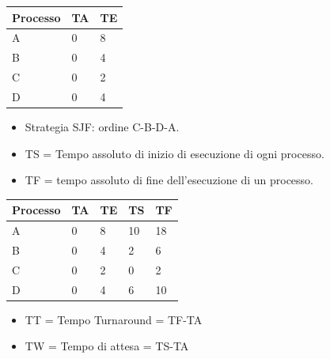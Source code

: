 \documentclass{article}
\begin{document}
\vskip 0.3cm
\begin{tabular}{|p{}|p{}|p{}|}
\hline
Processo        & TA              & TE      \\
\hline
A            & 0             & 8      \\
B            & 0             & 4      \\
C            & 0             & 2      \\
D            & 0             & 4      \\
\hline
\end{tabular}




\begin{itemize}
\item  Strategia SJF: ordine C-B-D-A.
\item  TS = Tempo assoluto di inizio di esecuzione di ogni processo.
\item  TF = tempo assoluto di fine dell’esecuzione di un processo.
\end{itemize}


\vskip 0.3cm
\begin{tabular}{|p{}|p{}|p{}|p{}|p{}|}
\hline
Processo        & TA              & TE      & TS      & TF      \\
\hline
A            & 0             & 8      & 10      & 18 \\
B            & 0             & 4      & 2      & 6      \\
C            & 0             & 2      & 0      & 2      \\
D            & 0             & 4      & 6      & 10      \\
\hline
\end{tabular}

\begin{itemize}
\item  TT = Tempo Turnaround = TF-TA
\item  TW = Tempo di attesa = TS-TA
\end{itemize}
\end{document}
